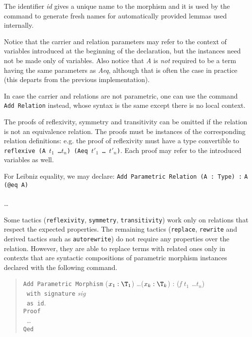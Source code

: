 The identifier \textit{id} gives a unique name to the morphism and it is
used by the command to generate fresh names for automatically provided lemmas
used internally.

Notice that the carrier and relation parameters may refer to the context 
of variables introduced at the beginning of the declaration, but the
instances need not be made only of variables.
Also notice that \textit{A} is \emph{not} required to be a term
having the same parameters as \textit{Aeq}, although that is often the
case in practice (this departs from the previous implementation).

In case the carrier and relations are not parametric, one can use the
command \texttt{Add Relation} instead, whose syntax is the same except
there is no local context.

The proofs of reflexivity, symmetry and transitivity can be omitted if the
relation is not an equivalence relation. The proofs must be instances of the
corresponding relation definitions: e.g. the proof of reflexivity must
have a type convertible to \texttt{reflexive (A $t_1$ \ldots $t_n$) (Aeq $t'_1$ \ldots
  $t'_n$)}. Each proof may refer to the introduced variables as well. 

\begin{cscexample}
For Leibniz equality, we may declare:
\texttt{Add Parametric Relation (A : Type) :} \texttt{A (@eq A)}\\
~\\
\ldots
\end{cscexample}

Some tactics
(\texttt{reflexivity}, \texttt{symmetry}, \texttt{transitivity}) work only
on relations that respect the expected properties. The remaining tactics
(\texttt{replace}, \texttt{rewrite} and derived tactics such as
\texttt{autorewrite}) do not require any properties over the relation.
However, they are able to replace terms with related ones only in contexts
that are syntactic compositions of parametric morphism instances declared with
the following command.

\begin{quote}
  \texttt{Add Parametric Morphism} ($x_1 : \T_1$) \ldots ($x_k : \T_k$) :
  (\textit{f $t_1$ \ldots $t_n$})\\
  \texttt{~with signature} \textit{sig}\\
  \texttt{~as id}.\\
  \texttt{Proof}\\
  ~\ldots\\
  \texttt{Qed}
\end{quote}

